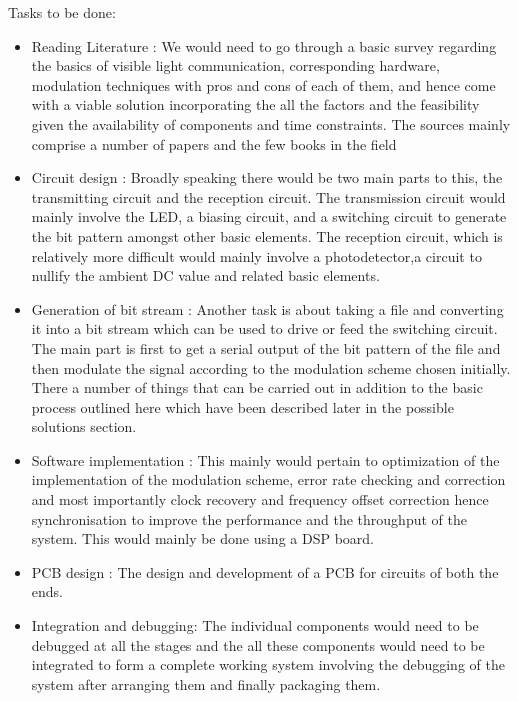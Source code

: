 \documentclass{article}
\begin{document}
Tasks to be done:
\begin{itemize}
\item Reading Literature :  We would need to go through a basic survey regarding the basics of visible light communication, corresponding hardware, modulation techniques with pros and cons of each of them, and hence come with a viable solution incorporating the all the factors and the feasibility given the availability of components and time constraints. The sources mainly comprise a number of papers and the few books in the field
\item Circuit design :  Broadly speaking there would be two main parts to this, the transmitting circuit and the reception circuit. The transmission circuit would mainly involve the LED, a biasing circuit, and a switching circuit to generate the bit pattern amongst other basic elements. The reception circuit, which is relatively more difficult would mainly involve a photodetector,a circuit to nullify the ambient DC value and related basic elements.
\item Generation of bit stream :  Another task is about taking a file and converting it into a bit stream which can be used to drive or feed the switching circuit. The main part is first to get a serial output of the bit pattern of the file and then modulate the signal according to the modulation scheme chosen initially. There a number of things that can be carried out in addition to the basic process outlined here which have been described later in the possible solutions section.
\item Software implementation : This mainly would pertain to optimization of the implementation of the modulation scheme, error rate checking and correction and most importantly clock recovery and frequency offset correction hence synchronisation to improve the performance and the throughput of the system. This would mainly be done using a DSP board.
\item PCB  design : The design and development of a PCB for circuits of both the ends.
\item Integration and debugging:  The individual components would need to be debugged at all the stages and the all these components would need to be integrated to form a complete working system involving the debugging of the system after arranging them and finally packaging them.

\end{itemize}
\end{document}
